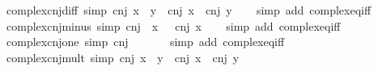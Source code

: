 \begin{isabellebody}
\endisatagproof
{\isafoldproof}%
%
\isadelimproof
\isanewline
%
\endisadelimproof
\isanewline
{}\isamarkupfalse%
\ complex{\isacharunderscore}{\kern0pt}cnj{\isacharunderscore}{\kern0pt}diff\ {\isacharbrackleft}{\kern0pt}simp{\isacharbrackright}{\kern0pt}{\isacharcolon}{\kern0pt}\ {\isachardoublequoteopen}cnj\ {\isacharparenleft}{\kern0pt}x\ {\isacharminus}{\kern0pt}\ y{\isacharparenright}{\kern0pt}\ {\isacharequal}{\kern0pt}\ cnj\ x\ {\isacharminus}{\kern0pt}\ cnj\ y{\isachardoublequoteclose}\isanewline
%
\isadelimproof
\ \ %
\endisadelimproof
%
\isatagproof
{}\isamarkupfalse%
\ {\isacharparenleft}{\kern0pt}simp\ add{\isacharcolon}{\kern0pt}\ complex{\isacharunderscore}{\kern0pt}eq{\isacharunderscore}{\kern0pt}iff{\isacharparenright}{\kern0pt}%
\endisatagproof
{\isafoldproof}%
%
\isadelimproof
\isanewline
%
\endisadelimproof
\isanewline
{}\isamarkupfalse%
\ complex{\isacharunderscore}{\kern0pt}cnj{\isacharunderscore}{\kern0pt}minus\ {\isacharbrackleft}{\kern0pt}simp{\isacharbrackright}{\kern0pt}{\isacharcolon}{\kern0pt}\ {\isachardoublequoteopen}cnj\ {\isacharparenleft}{\kern0pt}{\isacharminus}{\kern0pt}\ x{\isacharparenright}{\kern0pt}\ {\isacharequal}{\kern0pt}\ {\isacharminus}{\kern0pt}\ cnj\ x{\isachardoublequoteclose}\isanewline
%
\isadelimproof
\ \ %
\endisadelimproof
%
\isatagproof
{}\isamarkupfalse%
\ {\isacharparenleft}{\kern0pt}simp\ add{\isacharcolon}{\kern0pt}\ complex{\isacharunderscore}{\kern0pt}eq{\isacharunderscore}{\kern0pt}iff{\isacharparenright}{\kern0pt}%
\endisatagproof
{\isafoldproof}%
%
\isadelimproof
\isanewline
%
\endisadelimproof
\isanewline
{}\isamarkupfalse%
\ complex{\isacharunderscore}{\kern0pt}cnj{\isacharunderscore}{\kern0pt}one\ {\isacharbrackleft}{\kern0pt}simp{\isacharbrackright}{\kern0pt}{\isacharcolon}{\kern0pt}\ {\isachardoublequoteopen}cnj\ {}\ {\isacharequal}{\kern0pt}\ {}{\isachardoublequoteclose}\isanewline
%
\isadelimproof
\ \ %
\endisadelimproof
%
\isatagproof
{}\isamarkupfalse%
\ {\isacharparenleft}{\kern0pt}simp\ add{\isacharcolon}{\kern0pt}\ complex{\isacharunderscore}{\kern0pt}eq{\isacharunderscore}{\kern0pt}iff{\isacharparenright}{\kern0pt}%
\endisatagproof
{\isafoldproof}%
%
\isadelimproof
\isanewline
%
\endisadelimproof
\isanewline
{}\isamarkupfalse%
\ complex{\isacharunderscore}{\kern0pt}cnj{\isacharunderscore}{\kern0pt}mult\ {\isacharbrackleft}{\kern0pt}simp{\isacharbrackright}{\kern0pt}{\isacharcolon}{\kern0pt}\ {\isachardoublequoteopen}cnj\ {\isacharparenleft}{\kern0pt}x\ {\isacharasterisk}{\kern0pt}\ y{\isacharparenright}{\kern0pt}\ {\isacharequal}{\kern0pt}\ cnj\ x\ {\isacharasterisk}{\kern0pt}\ cnj\ y{\isachardoublequoteclose}\isanewline

\end{isabellebody}
